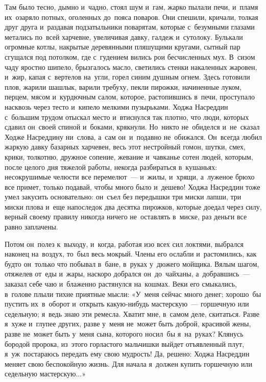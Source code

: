 \documentclass[12pt,a4paper]{book}
\begin{document}
Там было тесно, дымно и~чадно, стоял шум и~гам, жарко пылали печи, и~пламя их~озаряло потных, оголенных до~пояса поваров. Они спешили, кричали, толкая друг друга и~раздавая подзатыльники поварятам, которые с~безумными глазами метались по~всей харчевне, увеличивая давку, галдеж и~сутолоку. Булькали огромные котлы, накрытые деревянными пляшущими кругами, сытный пар сгущался под потолком, где с~гудением вились рои бесчисленных мух. В~сизом чаду яростно шипело, брызгалось масло, светились стенки накаленных жаровен, и~жир, капая с~вертелов на~угли, горел синим душным огнем. Здесь готовили плов, жарили шашлык, варили требуху, пекли пирожки, начиненные луком, перцем, мясом и~курдючным салом, которое, растопившись в~печи, проступало насквозь через тесто и~кипело мелкими пузырьками. Ходжа Насреддин с~большим трудом отыскал место и~втиснулся так плотно, что люди, которых сдавил он~своей спиной и~боками, крякнули. Но~никто не~обиделся и~не~сказал Ходже Насреддину ни~слова, а~сам он~и~подавно не~обижался. Он~всегда любил жаркую давку базарных харчевен, весь этот нестройный гомон, шутки, смех, крики, толкотню, дружное сопение, жевание и~чавканье сотен людей, которым, после целого дня тяжелой работы, некогда разбираться в~кушаньях: несокрушимые челюсти все перемелют~— и~жилы, и~хрящи, а~луженое брюхо все примет, только подавай, чтобы много было и~дешево! Ходжа Насреддин тоже умел закусить основательно: он~съел без передышки три миски лапши, три миски плова и~еще напоследок два десятка пирожков, которые доедал через силу, верный своему правилу никогда ничего не~оставлять в~миске, раз деньги все равно заплачены.

Потом он~полез к~выходу, и~когда, работая изо всех сил локтями, выбрался наконец на~воздух, то~был весь мокрый. Члены его ослабли и~растомились, как будто он~только что побывал в~бане, в~руках у~дюжего мойщика. Вялым шагом, отяжелев от~еды и~жары, наскоро добрался он~до~чайханы, а~добравшись~— заказал себе чаю и~блаженно растянулся на~кошмах. Веки его смыкались, в~голове плыли тихие приятные мысли: «У~меня сейчас много денег; хорошо~бы пустить их~в~оборот и~открыть какую-нибудь мастерскую~— горшечную или седельную; я~ведь знаю эти ремесла. Хватит мне, в~самом деле, скитаться. Разве я~хуже и~глупее других, разве у~меня не~может быть доброй, красивой жены, разве не~может быть у~меня сына, которого носил~бы я~на~руках? Клянусь бородой пророка, из~этого горластого мальчишки выйдет отъявленный плут, я~уж~постараюсь передать ему свою мудрость! Да, решено: Ходжа Насреддин меняет свою беспокойную жизнь. Для начала я~должен купить горшечную или седельную мастерскую...»
\end{document}
